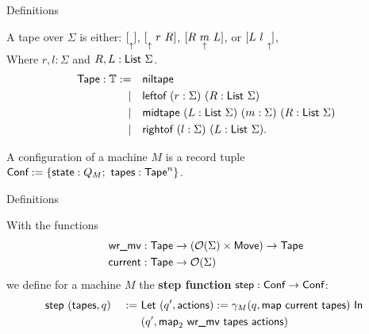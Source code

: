 \begin{frame}{Definitions}
  \begin{definition}[Tape]
    A tape over $\Sigma$ is either:
    $ [ \underset{\uparrow}{} ]$, $[ \underset{\uparrow}{}~r~R ]$, $[ R~\underset{\uparrow}{m}~L ]$, or $[ L~l~\underset{\uparrow}{} ]$,\\
    Where $r,l : \Sigma$ and $R,L : \textsf{List}~\Sigma$.
    \pause%
    \begin{alignat*}{2}
      \textsf{Tape}:\mathbb{T} := \quad & \textsf{niltape} \\
      | \quad & \textsf{leftof}  ~ (r:\Sigma) ~ (R:\textsf{List}~\Sigma) \\
      | \quad & \textsf{midtape} ~ (L:\textsf{List}~\Sigma) ~ (m:\Sigma) ~ (R:\textsf{List}~\Sigma) \\
      | \quad & \textsf{rightof} ~ (l:\Sigma) ~ (L:\textsf{List}~\Sigma).
    \end{alignat*}
  \end{definition}
  \pause%
  \begin{definition}[Configuration]
    A configuration of a machine $M$ is a record tuple $\textsf{Conf} := \{\textsf{state}:Q_M;~ \textsf{tapes}:\textsf{Tape}^n\}$.
  \end{definition}
\end{frame}

\begin{frame}{Definitions}
  \begin{definition}
    With the functions
    \begin{alignat*}{2}
      \textsf{wr\_mv}  & : \textsf{Tape} \rightarrow (\mathcal{O}(\Sigma) \times \textsf{Move}) \rightarrow \textsf{Tape} \\
      \textsf{current} & : \textsf{Tape} \rightarrow \mathcal{O}(\Sigma)
    \end{alignat*}
    we define for a machine $M$ the \textbf{step function} $\textsf{step} : \textsf{Conf} \rightarrow \textsf{Conf}$:
    \begin{alignat*}{2}
      \textsf{step}&~(\textsf{tapes}, q) &~:=~& \textsf{Let}~(q', \textsf{actions}) := \gamma_M(q, \textsf{map}~\textsf{current}~\textsf{tapes})~\textsf{In}~ \\
               &                 &~  ~& (q', \textsf{map}_2~\textsf{wr\_mv}~\textsf{tapes}~\textsf{actions})
      \end{alignat*}
  \end{definition}
\end{frame}

